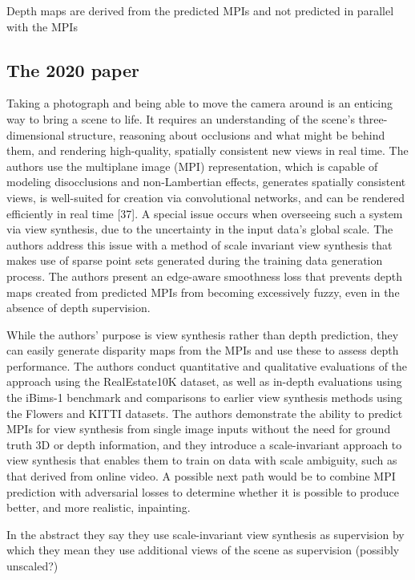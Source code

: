 Depth maps are derived from the predicted MPIs and not predicted in parallel with the MPIs

 \subsection{The 2020 paper}\label{subsec2:2020}

Taking a photograph and being able to move the camera around is an enticing way to bring a scene to life. It requires an understanding of the scene's three-dimensional structure, reasoning about occlusions and what might be behind them, and rendering high-quality, spatially consistent new views in real time. The authors use the multiplane image (MPI) representation, which is capable of modeling disocclusions and non-Lambertian effects, generates spatially consistent views, is well-suited for creation via convolutional networks, and can be rendered efficiently in real time [37]. A special issue occurs when overseeing such a system via view synthesis, due to the uncertainty in the input data's global scale. The authors address this issue with a method of scale invariant view synthesis that makes use of sparse point sets generated during the training data generation process. The authors present an edge-aware smoothness loss that prevents depth maps created from predicted MPIs from becoming excessively fuzzy, even in the absence of depth supervision.

While the authors' purpose is view synthesis rather than depth prediction, they can easily generate disparity maps from the MPIs and use these to assess depth performance. The authors conduct quantitative and qualitative evaluations of the approach using the RealEstate10K dataset, as well as in-depth evaluations using the iBims-1 benchmark and comparisons to earlier view synthesis methods using the Flowers and KITTI datasets. The authors demonstrate the ability to predict MPIs for view synthesis from single image inputs without the need for ground truth 3D or depth information, and they introduce a scale-invariant approach to view synthesis that enables them to train on data with scale ambiguity, such as that derived from online video. A possible next path would be to combine MPI prediction with adversarial losses to determine whether it is possible to produce better, and more realistic, inpainting.


In the abstract they say they use scale-invariant view synthesis as supervision by which they mean they use additional views of the scene  as supervision (possibly unscaled?)


